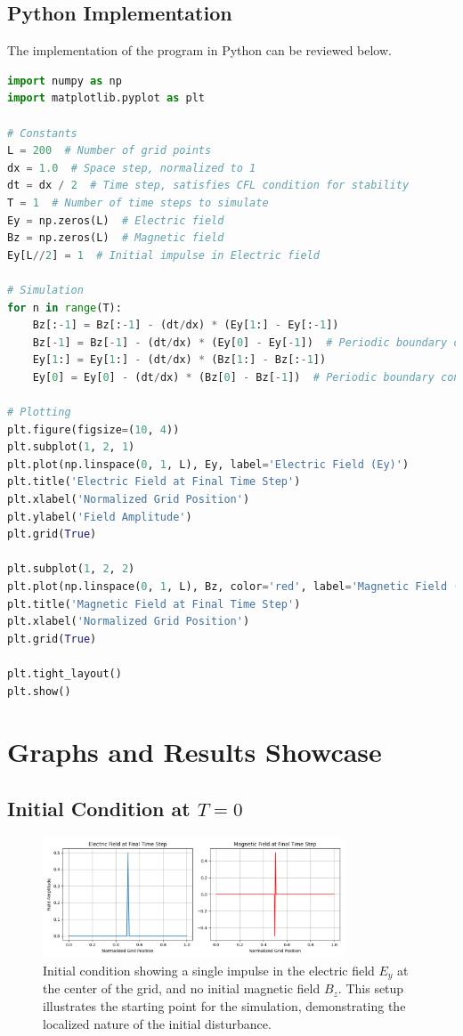 \documentclass{article}[a4paper]
\begin{document}
\subsection{Python Implementation}

The implementation of the program in Python can be reviewed below.

\begin{lstlisting}[language=Python, caption=1D FDTD Simulation in Python]
import numpy as np
import matplotlib.pyplot as plt

# Constants
L = 200  # Number of grid points
dx = 1.0  # Space step, normalized to 1
dt = dx / 2  # Time step, satisfies CFL condition for stability
T = 1  # Number of time steps to simulate
Ey = np.zeros(L)  # Electric field
Bz = np.zeros(L)  # Magnetic field
Ey[L//2] = 1  # Initial impulse in Electric field

# Simulation
for n in range(T):
    Bz[:-1] = Bz[:-1] - (dt/dx) * (Ey[1:] - Ey[:-1])
    Bz[-1] = Bz[-1] - (dt/dx) * (Ey[0] - Ey[-1])  # Periodic boundary condition
    Ey[1:] = Ey[1:] - (dt/dx) * (Bz[1:] - Bz[:-1])
    Ey[0] = Ey[0] - (dt/dx) * (Bz[0] - Bz[-1])  # Periodic boundary condition

# Plotting
plt.figure(figsize=(10, 4))
plt.subplot(1, 2, 1)
plt.plot(np.linspace(0, 1, L), Ey, label='Electric Field (Ey)')
plt.title('Electric Field at Final Time Step')
plt.xlabel('Normalized Grid Position')
plt.ylabel('Field Amplitude')
plt.grid(True)

plt.subplot(1, 2, 2)
plt.plot(np.linspace(0, 1, L), Bz, color='red', label='Magnetic Field (Bz)')
plt.title('Magnetic Field at Final Time Step')
plt.xlabel('Normalized Grid Position')
plt.grid(True)

plt.tight_layout()
plt.show()
\end{lstlisting}

\section{Graphs and Results Showcase}

\subsection{Initial Condition at \( T = 0 \)}
\begin{figure}[H]
    \centering
    \includegraphics[width=0.8\textwidth]{materials/Figure_0.png}
    \caption{Initial condition showing a single impulse in the electric field \( E_y \) at the center of the grid, and no initial magnetic field \( B_z \). This setup illustrates the starting point for the simulation, demonstrating the localized nature of the initial disturbance.}
\end{figure}
\end{document}
